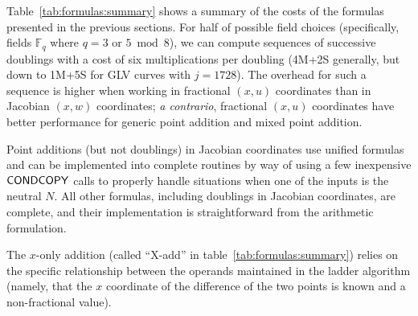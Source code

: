 \documentclass{llncs}
\newcommand{\bF}{\mathbb{F}}
\begin{document}
Table~\ref{tab:formulas:summary} shows a summary of the costs of the
formulas presented in the previous sections. For half of possible field
choices (specifically, fields $\bF_q$ where $q = 3$ or $5\bmod 8$), we
can compute sequences of successive doublings with a cost of six
multiplications per doubling (4M+2S generally, but down to 1M+5S for GLV
curves with $j = 1728$). The overhead for such a sequence is higher when
working in fractional $(x,u)$ coordinates than in Jacobian $(x,w)$
coordinates; \emph{a contrario}, fractional $(x,u)$ coordinates have
better performance for generic point addition and mixed point addition.

Point additions (but not doublings) in Jacobian coordinates use unified
formulas and can be implemented into complete routines by way of using a
few inexpensive $\text{\textsf{CONDCOPY}}$ calls to properly handle
situations when one of the inputs is the neutral $N$. All other
formulas, including doublings in Jacobian coordinates, are complete, and
their implementation is straightforward from the arithmetic formulation.

The $x$-only addition (called ``X-add'' in
table~\ref{tab:formulas:summary}) relies on the specific relationship
between the operands maintained in the ladder algorithm (namely, that
the $x$ coordinate of the difference of the two points is known and a
non-fractional value).
\end{document}
